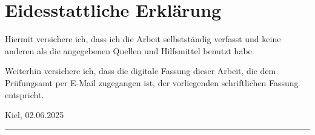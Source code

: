 
\chapter*{\Large Eidesstattliche Erklärung}

\vspace{0.5cm}

\noindent Hiermit versichere ich, dass ich die Arbeit selbstständig verfasst und keine anderen als die angegebenen Quellen und Hilfsmittel benutzt habe.

Weiterhin versichere ich, dass die digitale Fassung dieser Arbeit, die dem Prüfungsamt per E-Mail zugegangen ist, der vorliegenden schriftlichen Fassung entspricht.

\bigskip\noindent Kiel, 02.06.2025
\vskip 10mm
\hfill\rule{18em}{.3pt}%
\vfill
